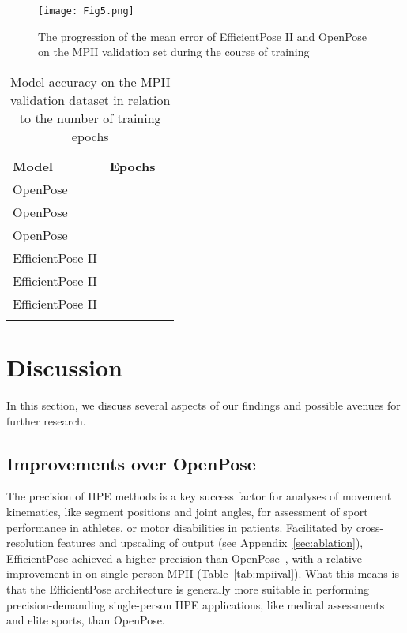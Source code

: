 \begin{figure*}
\begin{center}
\texttt{[image: Fig5.png]}
\caption{The progression of the mean error of EfficientPose II and OpenPose on the MPII validation set during the course of training}
\label{fig:convergence}       
\end{center}
\end{figure*}

\begin{table*}
\centering
\caption{Model accuracy on the MPII validation dataset in relation to the number of training epochs}
\label{tab:epochs}       
\begin{tabular}{lll}
\hline\noalign{\smallskip}
\textbf{Model} & \textbf{Epochs} &   \\
\noalign{\smallskip}\hline\noalign{\smallskip}
OpenPose~\cite{cao2018openpose} &  &  \\
OpenPose~\cite{cao2018openpose} &  &  \\
OpenPose~\cite{cao2018openpose} &  &  \\
EfficientPose II &  &  \\
EfficientPose II &  &  \\
EfficientPose II &  &  \\
\noalign{\smallskip}\hline
\end{tabular}
\end{table*}

\section{Discussion}
\label{sec:discussion}

In this section, we discuss several aspects of our findings and possible avenues for further research.

\subsection{Improvements over OpenPose}
\label{sec:improvement}

The precision of HPE methods is a key success factor for analyses of movement kinematics, like segment positions and joint angles, for assessment of sport performance in athletes, or motor disabilities in patients. Facilitated by cross-resolution features and upscaling of output (see Appendix~\ref{sec:ablation}), EfficientPose achieved a higher precision than OpenPose~\cite{cao2018openpose}, with a  relative improvement in  on single-person MPII (Table~\ref{tab:mpiival}). What this means is that the EfficientPose architecture is generally more suitable in performing precision-demanding single-person HPE applications, like medical assessments and elite sports, than OpenPose. 

